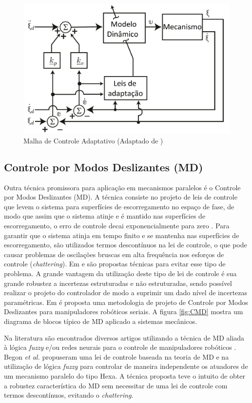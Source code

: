 \documentclass[]{politex}
\begin{document}
\begin{figure}[h]
	\centering
	\includegraphics[scale=0.47]{../figures/CAnew.jpg}  
	\caption{Malha de Controle Adaptativo (Adaptado de \cite{Craig})}
	\label{fig:CA}
\end{figure}

\subsection{Controle por Modos Deslizantes (MD)}

Outra técnica promissora para aplicação em mecanismos paralelos é o Controle por Modos Deslizantes (MD). A técnica consiste no projeto de leis de controle que levem o sistema para superfícies de escorregamento no espaço de fase, de modo que assim que o sistema atinje e é mantido nas superfícies de escorregamento, o erro de controle decai exponencialmente para zero \cite{Slotini}. Para garantir que o sistema atinja em tempo finito e se mantenha nas superfícies de escorregamento, são utilizados termos descontínuos na lei de controle, o que pode causar problemas de oscilações bruscas em alta frequência nos esforços de controle ({\em chattering}). Em \cite{Guldner}  e  \cite{Utkin2} são propostas técnicas para evitar esse tipo de problema. A grande vantagem da utilização deste tipo de lei de controle é sua grande robustez a incertezas estruturadas e não estruturadas, sendo possível realizar o projeto do controlador de modo a suprimir um dado nível de incertezas paramétricas. Em \cite{SlotiniSMC} é proposta uma metodologia de projeto de Controle por Modos Deslizantes para manipuladores robóticos seriais. A figura \ref{fig:CMD} mostra um diagrama de blocos típico de MD aplicado a sistemas mecânicos. 

Na literatura são encontrados diversos artigos utilizando a técnica de MD aliada à lógica {\em fuzzy} e/ou redes neurais para o controle de manipuladores robóticos \cite{Begon, Ertugrul, Hu, Sadati}. Begon \emph{et al.} \cite{Begon} propuseram uma lei de controle baseada na teoria de MD e na utilização de lógica {\em fuzzy} para controlar de maneira independente os atuadores de um mecanismo paralelo do tipo Hexa. A técnica proposta teve o intuito de obter a robustez característica do MD sem necessitar de uma lei de controle com termos descontínuos, evitando o {\em chattering}.
\end{document}
